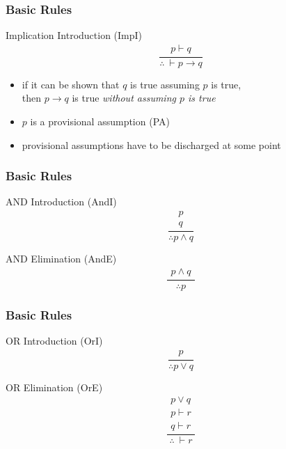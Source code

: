 \documentclass[dvipsnames]{beamer}
\begin{document}
\begin{frame}
  \frametitle{Basic Rules}

  \begin{block}{Implication Introduction (ImpI)}
    \[
    \frac
      {
        \begin{array}{c}
          p \vdash q
        \end{array}
      }
      {
        \therefore ~ \vdash p \rightarrow q
      }
    \]
  \end{block}

  \begin{itemize}
    \item if it can be shown that $q$ is true assuming $p$ is true,\\
      then $p \rightarrow q$ is true \emph{without assuming $p$ is true}

    \pause
    \medskip
    \item $p$ is a \alert{provisional assumption} (PA)
    \item provisional assumptions have to be \alert{discharged} at some point
  \end{itemize}
\end{frame}

\begin{frame}
  \frametitle{Basic Rules}

  \begin{block}{AND Introduction (AndI)}
    \[
    \frac
      {
        \begin{array}{c}
          p\\
          q
        \end{array}
      }
      {
        \therefore p \wedge q
      }
    \]
  \end{block}

  \pause
  \begin{block}{AND Elimination (AndE)}
  \[
  \frac
    {
      \begin{array}{c}
        p \wedge q
      \end{array}
    }
    {
      \therefore p
    }
  \]
  \end{block}
\end{frame}

\begin{frame}
  \frametitle{Basic Rules}

  \begin{block}{OR Introduction (OrI)}
    \[
    \frac
      {
        \begin{array}{c}
          p
        \end{array}
      }
      {
        \therefore p \vee q
      }
    \]
  \end{block}

  \pause
  \begin{block}{OR Elimination (OrE)}
  \[
  \frac
    {
      \begin{array}{c}
        p \vee q\\
        p \vdash r\\
        q \vdash r
      \end{array}
    }
    {
      \therefore ~ \vdash r
    }
  \]
  \end{block}
\end{frame}
\end{document}
